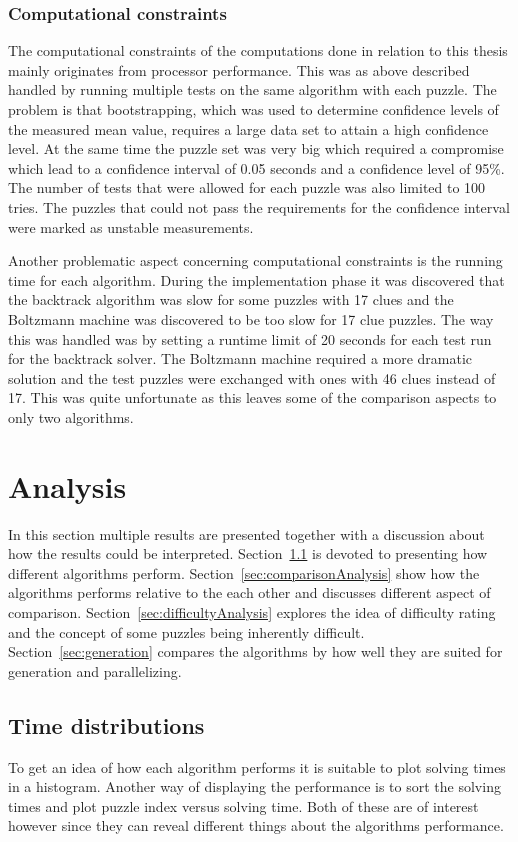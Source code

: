 \documentclass[a4paper,11pt]{kth-mag}
\begin{document}
\subsection{Computational constraints}
The computational constraints of the computations done in relation to this thesis mainly originates from processor performance.
This was as above described handled by running multiple tests on the same algorithm with each puzzle.
The problem is that bootstrapping, which was used to determine confidence levels of the measured mean value, requires a large data set to attain a high confidence level. 
At the same time the puzzle set was very big which required a compromise which lead to a confidence interval of 0.05 seconds and a confidence level of 95\%. The number of tests that were allowed for each puzzle was also limited to 100 tries.
The puzzles that could not pass the requirements for the confidence interval were marked as unstable measurements.

Another problematic aspect concerning computational constraints is the running time for each algorithm.
During the implementation phase it was discovered that the backtrack algorithm was slow for some puzzles with 17 clues and the Boltzmann machine was discovered to be too slow for 17 clue puzzles.
The way this was handled was by setting a runtime limit of 20 seconds for each test run for the backtrack solver.
The Boltzmann machine required a more dramatic solution and the test puzzles were exchanged with ones with 46 clues instead of 17. 
This was quite unfortunate as this leaves some of the comparison aspects to only two algorithms.

\chapter{Analysis}
In this section multiple results are presented together with a discussion about how the results could be interpreted. 
Section~\ref{sec:timeDistributions} is devoted to presenting how different algorithms perform. 
Section~\ref{sec:comparisonAnalysis} show how the algorithms performs relative to the each other and discusses different aspect of comparison.
Section~\ref{sec:difficultyAnalysis} explores the idea of difficulty rating and the concept of some puzzles being inherently difficult.
Section~\ref{sec:generation} compares the algorithms by how well they are suited for generation and parallelizing.

\FloatBarrier
\section{Time distributions}
\label{sec:timeDistributions}
To get an idea of how each algorithm performs it is suitable to plot solving times in a histogram. 
Another way of displaying the performance is to sort the solving times and plot puzzle index versus solving time. 
Both of these are of interest however since they can reveal different things about the algorithms performance. 
 
\end{document}
